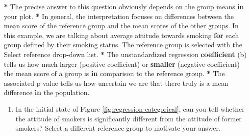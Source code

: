 \documentclass[a4paper]{book}
\newenvironment{Shaded}{\begin{snugshade}}{\end{snugshade}}
\newcommand{\KeywordTok}[1]{\textcolor[rgb]{0,0,0}{\textbf{#1}}}
\newcommand{\StringTok}[1]{\textcolor[rgb]{0.00,0.00,0.00}{#1}}
\newcommand{\ControlFlowTok}[1]{\textcolor[rgb]{0.00,0.00,0.00}{\textbf{#1}}}
\newcommand{\OperatorTok}[1]{\textcolor[rgb]{0.00,0.00,0.00}{\textbf{#1}}}
\newcommand{\NormalTok}[1]{#1}
\providecommand{\tightlist}{%
  \setlength{\itemsep}{0pt}\setlength{\parskip}{0pt}}
\theoremstyle{definition}
\theoremstyle{definition}
\theoremstyle{definition}
\theoremstyle{remark}
\begin{document}
\begin{Shaded}
\begin{Highlighting}[]
\OperatorTok{*}\StringTok{ }\NormalTok{The precise answer to this question obviously depends on the group means }\ControlFlowTok{in}
\NormalTok{your plot.}
\OperatorTok{*}\StringTok{ }\NormalTok{In general, the interpretation focuses on differences between the mean score}
\NormalTok{of the reference group and the mean scores of the other groups. In this}
\NormalTok{example, we are talking about average attitude towards smoking }\ControlFlowTok{for}\NormalTok{ each group}
\NormalTok{defined by their smoking status. The reference group is selected with the}
\NormalTok{Select reference drop}\OperatorTok{-}\NormalTok{down list.}
\OperatorTok{*}\StringTok{ }\NormalTok{The unstandardized regression }\KeywordTok{coefficient}\NormalTok{ (b) tells us how much larger}
\NormalTok{(positive coefficient) or }\KeywordTok{smaller}\NormalTok{ (negative coefficient) the mean score of a}
\NormalTok{group is }\ControlFlowTok{in}\NormalTok{ comparison to the reference group.}
\OperatorTok{*}\StringTok{ }\NormalTok{The associated p value tells us how uncertain we are that there truly is a}
\NormalTok{mean difference }\ControlFlowTok{in}\NormalTok{ the population.}
\end{Highlighting}
\end{Shaded}

\begin{enumerate}
\def\labelenumi{\arabic{enumi}.}
\setcounter{enumi}{1}
\tightlist
\item
  In the initial state of Figure \ref{fig:regression-categorical}, can
  you tell whether the attitude of smokers is significantly different
  from the attitude of former smokers? Select a different reference
  group to motivate your answer.
\end{enumerate}
\end{document}
